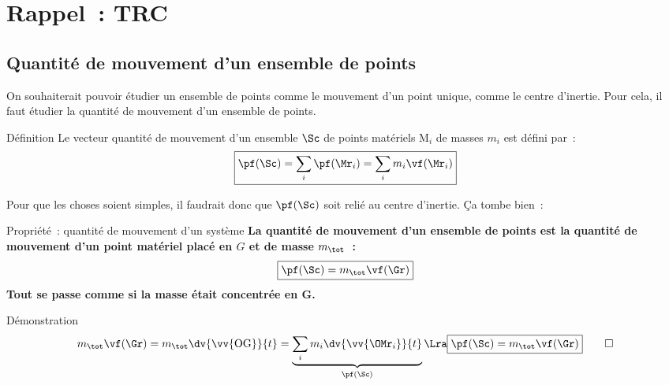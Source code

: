 \documentclass[../main/main.tex]{subfiles}
\begin{document}
\section{Rappel~: TRC}
\subsection{Quantité de mouvement d'un ensemble de points}

On souhaiterait pouvoir étudier un ensemble de points comme le mouvement d'un
point unique, comme le centre d'inertie. Pour cela, il faut étudier la quantité
de mouvement d'un ensemble de points.

\begin{tdefi}{Définition}
    Le vecteur quantité de mouvement d'un ensemble $\Sc$ de points matériels
    M$_i$ de masses $m_i$ est défini par~:
    \[\boxed{\pf(\Sc) = \sum_i\pf(\Mr_i) = \sum_i m_i \vf(\Mr_i)}\]
\end{tdefi}

Pour que les choses soient simples, il faudrait donc que $\pf(\Sc)$ soit relié
au centre d'inertie. Ça tombe bien~:

\begin{tprop}{Propriété~: quantité de mouvement d'un système}
    \centering\bfseries
    La quantité de mouvement d'un ensemble de points est la quantité de
    mouvement d'un point matériel placé en $G$ et de masse $m_{\tot}$~:
    \[\boxed{\pf(\Sc) = m_{\tot}\vf(\Gr)}\]
    Tout se passe comme si la masse était concentrée en G.
\end{tprop}

\begin{tdemo}{Démonstration}
    \begin{gather*}
        m_{\tot}\vf(\Gr) = m_{\tot}\dv{\vv{\rm OG}}{t} =
            \underbrace{\sum_i m_i \dv{\vv{\OMr_i}}{t}}_{\pf(\Sc)}
        \Lra
        \boxed{\pf(\Sc) = m_{\tot}\vf(\Gr)}
        \qed
    \end{gather*}
\end{tdemo}
\end{document}
